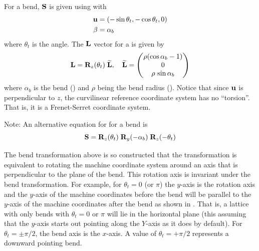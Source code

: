 For a bend, ${\bf S}$ is given using  with 
\begin{align}
  {\bf u} &= (-\sin\theta_t, -\cos\theta_t, 0) \nonumber \\
  \beta &= \alpha_b
  \label{ustt}
\end{align}
where $\theta_t$ is the  angle. The ${\bf L}$ vector for a  is given by 
\begin{equation}
  {\bf L} = {\bf R}_{z}(\theta_t) \; {\widetilde{\bf L}}, \quad
  {\widetilde{\bf L}} = 
  \begin{pmatrix}
    \rho (\cos\alpha_b - 1) \\ 0 \\ \rho \, \sin\alpha_b
  \end{pmatrix}
  \label{lrztt}
\end{equation}
where $\alpha_b$ is the bend  () and $\rho$ being the bend radius
(). Notice that since ${\bf u}$ is perpendicular to $z$, the curvilinear reference coordinate
system has no ``torsion''. That is, it is a Frenet-Serret coordinate system.

Note: An alternative equation for \vn{\bfS} for a bend is
 \begin{equation}
  {\bf S} = {\bf R}_{z}(\theta_t) \; {\bf R}_{y}(-\alpha_b) \; {\bf R}_{z}(-\theta_t)
  \label{srrr}
\end{equation}

The bend transformation above is so constructed that the transformation is equivalent to rotating
the machine coordinate system around an axis that is perpendicular to the plane of the bend. This
rotation axis is invariant under the bend transformation. For example, for $\theta_t = 0$ (or $\pi$)
the $y$-axis is the rotation axis and the $y$-axis of the machine coordinates before the bend will be
parallel to the $y$-axis of the machine coordinates after the bend as shown in . That
is, a lattice with only bends with $\theta_t = 0$ or $\pi$ will lie in the horizontal plane (this
assuming that the $y$-axis starts out pointing along the $Y$-axis as it does by default).  For
$\theta_t = \pm\pi/2$, the bend axis is the $x$-axis. A value of $\theta_t = +\pi/2$ represents a
downward pointing bend.

